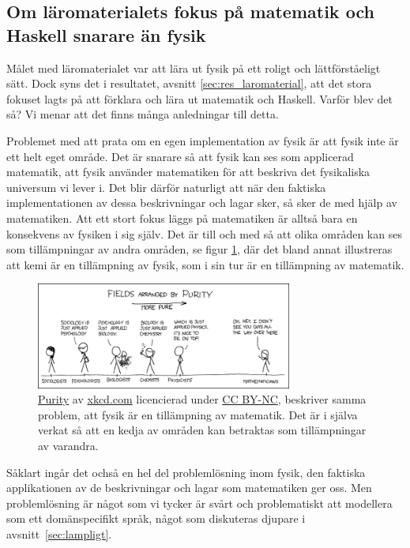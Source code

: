 \begin{draft}

\subsection{Om läromaterialets fokus på matematik och Haskell snarare än
fysik}
\label{sec:fpf}

Målet med läromaterialet var att lära ut fysik på ett roligt och lättförståeligt
sätt. Dock syns det i resultatet, avsnitt \ref{sec:res_laromaterial}, att det stora fokuset lagts på att
förklara och lära ut matematik och Haskell. Varför blev det så? Vi menar att det
finns många anledningar till detta. 

Problemet med att prata om en egen implementation av fysik är att fysik inte är
ett helt eget område. Det är snarare så att fysik kan ses som applicerad
matematik, att fysik använder matematiken för att beskriva det fysikaliska
universum vi lever i. Det blir därför naturligt att när den faktiska
implementationen av dessa beskrivningar och lagar sker, så sker de med hjälp av
matematiken. Att ett stort fokus läggs på matematiken är alltså bara en
konsekvens av fysiken i sig själv. Det är till och med så att olika områden kan ses som tillämpningar av andra områden, se figur \ref{fig:xkcd}, där det bland annat illustreras att kemi är en tillämpning av fysik, som i sin tur är en tillämpning av matematik.

\begin{figure}[tph]
  \centering
  \includegraphics[width=0.75\textwidth]{figure/purity.png}
  \caption{\href{https://xkcd.com/435/}{Purity} av \href{https://xkcd.com}{xkcd.com} licencierad under
  \href{https://creativecommons.org/licenses/by-nc/2.5/}{CC BY-NC}, beskriver samma problem, att fysik är en tillämpning av matematik. Det är i själva verkat så att en kedja av områden kan betraktas som tillämpningar av varandra.}
  \label{fig:xkcd}
\end{figure}

Såklart ingår det ochså en hel del problemlösning inom fysik, den faktiska
applikationen av de beskrivningar och lagar som matematiken ger oss. Men
problemlösning är något som vi tycker är svårt och problematiskt att modellera
som ett domänspecifikt språk, något som diskuteras djupare i
avsnitt~\ref{sec:lampligt}.


\end{draft}
